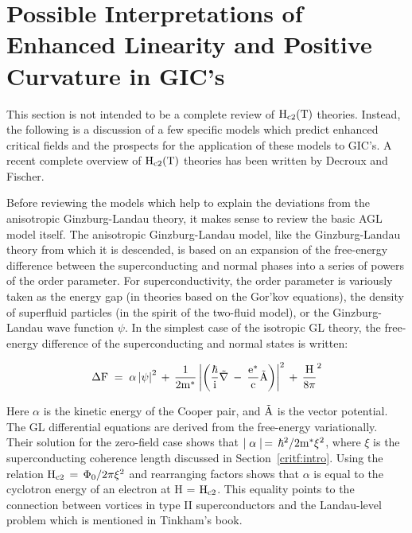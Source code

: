 \section{Possible Interpretations of Enhanced Linearity and Positive
Curvature in GIC's}
\label{models}

        This section is  not  intended  to   be a complete  review of  $\rm
H_{c2}(T)$   theories.  Instead, the  following is  a  discussion  of a few
specific models which predict  enhanced critical fields  and  the prospects
for the application  of these models to  GIC's.  A recent complete overview  of $\rm
H_{c2}(T)$    theories   has     been     written   by      Decroux     and
Fischer.\cite{decroux82}

        Before reviewing the  models which help  to explain  the deviations
from the  anisotropic Ginzburg-Landau theory,  it makes sense to review the
basic AGL model  itself.  The anisotropic  Ginzburg-Landau model,  like the
Ginzburg-Landau theory\cite{tinkham80} from which it is descended, is based
on  an expansion of the  free-energy difference between the superconducting
and  normal phases into  a series of powers  of the order  parameter.   For
superconductivity, the order parameter is variously taken as the energy gap
(in theories based on  the Gor'kov equations\cite{gorkov59,gorkov60}),  the
density of superfluid particles (in the spirit of  the two-fluid model), or
the Ginzburg-Landau wave  function  $\psi$.  In the  simplest case   of the
isotropic GL theory, the free-energy difference of the  superconducting and
normal states is written:

\begin{equation}
\label{deltaf}
\rm \Delta F \;  =  \; \alpha \left| \psi \right|^2 \, + \,
\frac{1}{2m^*}\left| \left( \frac{\hbar}{i}\vec{\nabla} \: - \:
\frac{e^*}{c}\vec{A} \right) \right|^2 \, + \, \frac{H}{8\pi}^2
\end{equation}

\noindent Here $\alpha$ is the kinetic energy of the Cooper pair, and
$\rm \vec{A}$ is   the vector  potential.  The GL   differential  equations are
derived  from   the free-energy  variationally.    Their solution   for the
zero-field case shows that $\rm \mid \alpha \mid \, = \, \hbar^2 / 2m^* \xi^2$, where
$\xi$    is   the   superconducting     coherence  length    discussed   in
Section~\ref{critf:intro}.  Using the relation $\rm H_{c2} \, = \, \Phi_0 /
2\pi
\xi ^2$ and rearranging factors shows that  $\alpha$ is equal to the cyclotron 
energy  of an electron at H  = $\rm H_{c2}$.   This equality  points to the
connection between vortices in type II superconductors and the Landau-level
problem which is mentioned in Tinkham's book.\cite[Section 4-8]{tinkham80}


